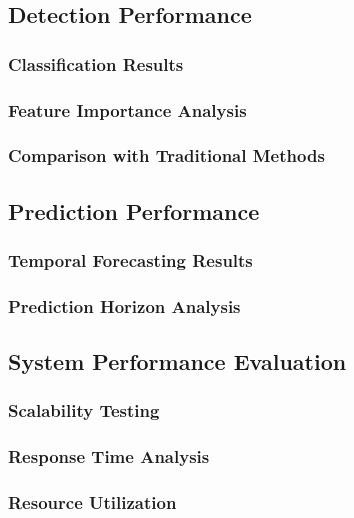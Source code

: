 \documentclass[conference]{IEEEtran}
\begin{document}
\subsection{Detection Performance}

\subsubsection{Classification Results}

\subsubsection{Feature Importance Analysis}

\subsubsection{Comparison with Traditional Methods}

\subsection{Prediction Performance}

\subsubsection{Temporal Forecasting Results}

\subsubsection{Prediction Horizon Analysis}

\subsection{System Performance Evaluation}

\subsubsection{Scalability Testing}

\subsubsection{Response Time Analysis}

\subsubsection{Resource Utilization}
\end{document}
